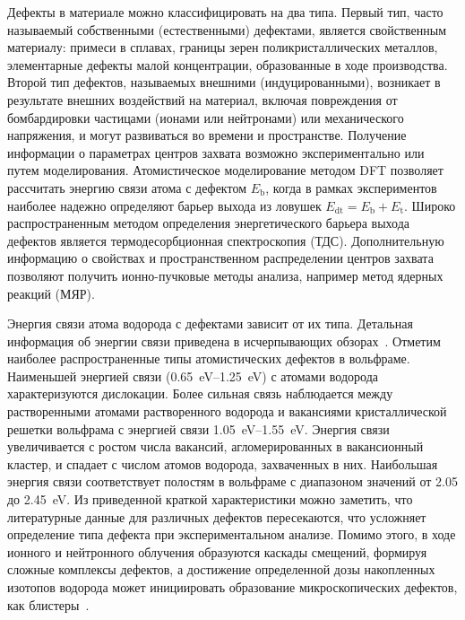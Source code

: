Дефекты в материале можно классифицировать на два типа. Первый тип, часто называемый собственными (естественными) дефектами, является свойственным материалу: примеси в сплавах, границы зерен поликристаллических металлов, элементарные дефекты малой концентрации, образованные в ходе производства. Второй тип дефектов, называемых внешними (индуцированными), возникает в результате внешних воздействий на материал, включая повреждения от бомбардировки частицами (ионами или нейтронами) или механического напряжения, и могут развиваться во времени и пространстве. Получение информации о параметрах центров захвата возможно экспериментально или путем моделирования. Атомистическое моделирование методом DFT позволяет рассчитать энергию связи атома с дефектом \( E_\mathrm{b} \), когда в рамках экспериментов наиболее надежно определяют барьер выхода из ловушек \( E_\mathrm{dt}=E_\mathrm{b} + E_\mathrm{t} \). Широко распространенным методом определения энергетического барьера выхода дефектов является термодесорбционная спектроскопия (ТДС). Дополнительную информацию о свойствах и пространственном распределении центров захвата позволяют получить ионно-пучковые методы анализа, например метод ядерных реакций (МЯР). 


Энергия связи атома водорода с дефектами зависит от их типа. Детальная информация об энергии связи приведена в исчерпывающих обзорах~\cite{Ogorodnikova2015,Li2020,Persianova2024}. Отметим наиболее распространенные типы атомистических дефектов в вольфраме. Наименьшей энергией связи (\SIrange{0.65}{1.25}{\electronvolt}) с атомами водорода характеризуются дислокации. Более сильная связь наблюдается между растворенными атомами растворенного водорода и вакансиями кристаллической решетки вольфрама с энергией связи \SIrange{1.05}{1.55}{\electronvolt}. Энергия связи увеличивается с ростом числа вакансий, агломерированных в вакансионный кластер, и спадает с числом атомов водорода, захваченных в них. Наибольшая энергия связи соответствует полостям в вольфраме с диапазоном значений от \num{2.05} до \SI{2.45}{\electronvolt}. Из приведенной краткой характеристики можно заметить, что литературные данные для различных дефектов пересекаются, что усложняет определение типа дефекта при экспериментальном анализе. Помимо этого, в ходе ионного и нейтронного облучения образуются каскады смещений, формируя сложные комплексы дефектов, а достижение определенной дозы накопленных изотопов водорода может инициировать образование микроскопических дефектов, как блистеры~\cite{Wang2001}. 

